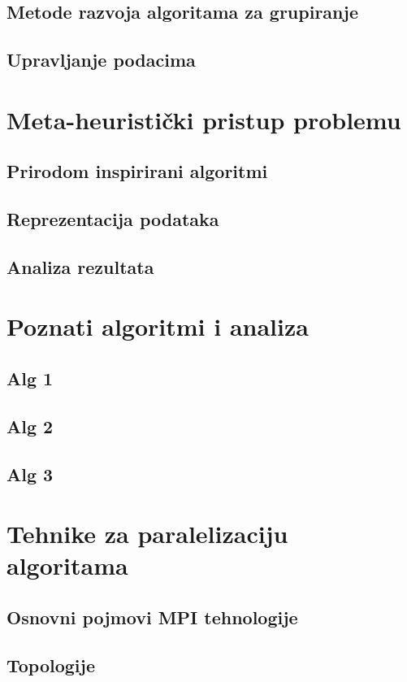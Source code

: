 \documentclass[a4paper,twoside,12pt]{memoir} %
\begin{document}
\section[Metode razvoja algoritama za grupiranje][metode razvoja]{Metode razvoja algoritama za grupiranje}
\section[Upravljanje podacima][upravljanje-podacima]{Upravljanje podacima}

\chapter[Metaheuristike]{Meta-heuristički pristup problemu}
\section[Prirodom inspirirani algoritmi][prirodni-algoritmi]{Prirodom inspirirani algoritmi}
\section{Reprezentacija podataka}
\section{Analiza rezultata}
\chapter{Poznati algoritmi i analiza}
\section{Alg 1}
\section{Alg 2}
\section{Alg 3}
\chapter{Tehnike za paralelizaciju algoritama}
\section[Osnovni pojmovi MPI tehnologije][mpi]{Osnovni pojmovi MPI tehnologije}
\section[Topologija][topologija]{Topologije}
\end{document}

